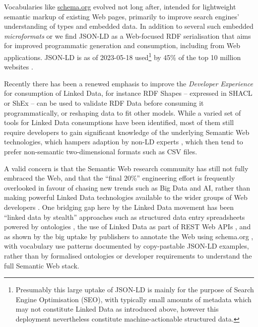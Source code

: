 \documentclass[fleqn,10pt,NOlineno]{wlpeerjlua}
\begin{document}
Vocabularies like \href{https://schema.org/}{schema.org} evolved not long after, intended for lightweight semantic markup of existing Web pages, primarily to improve search engines' understanding of types and embedded data. In addition to several such embedded \emph{microformats} \autocite{OpenGraphProtocol,w3-rdfa-primer,HTMLStandard} or we find JSON-LD \autocite{w3-json-ld} as a Web-focused RDF serialisation that aims for improved programmatic generation and consumption, including from Web applications. JSON-LD is as of 2023-05-18 used\footnote{Presumably this large uptake of JSON-LD is mainly for the purpose of Search Engine Optimisation (SEO), with typically small amounts of metadata which may not constitute Linked Data as introduced above, however this deployment nevertheless constitute machine-actionable structured data.} by 45\% of the top 10 million websites \autocite{UsageStatisticsJSONLD}.

Recently there has been a renewed emphasis to improve the \emph{Developer Experience} \autocite{DesigningLinkedData2018} for consumption of Linked Data, for instance RDF Shapes -- expressed in SHACL \autocite{w3-shacl} or ShEx \autocite{ShapeExpressionsShEx} -- can be used to validate RDF Data \autocite{gayoValidatingRDFData2017a,thorntonUsingShapeExpressions2019a} before consuming it programmatically, or reshaping data to fit other models. While a varied set of tools for Linked Data consumptions have been identified, most of them still require developers to gain significant knowledge of the underlying Semantic Web technologies, which hampers adaption by non-LD experts \autocite{klimekSurveyToolsLinked2019a}, which then tend to prefer non-semantic two-dimensional formats such as CSV files.

A valid concern is that the Semantic Web research community has still not fully embraced the Web, and that the ``final 20\%'' engineering effort is frequently overlooked in favour of chasing new trends such as Big Data and AI, rather than making powerful Linked Data technologies available to the wider groups of Web developers \autocite{verborghSemanticWebIdentity2020a}. One bridging gap here by the Linked Data movement has been ``linked data by stealth'' approaches such as structured data entry spreadsheets powered by ontologies \autocite{wolstencroftRightFieldEmbeddingOntology2011b}, the use of Linked Data as part of REST Web APIs \autocite{pageRESTLinkedData2011}, and as shown by the big uptake by publishers to annotate the Web using schema.org \autocite{bernsteinNewLookSemantic2016a}, with vocabulary use patterns documented by copy-pastable JSON-LD examples, rather than by formalised ontologies or developer requirements to understand the full Semantic Web stack.
\end{document}
